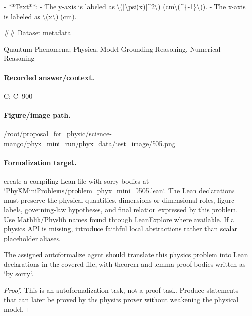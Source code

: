 - **Text**:
  - The y-axis is labeled as \textbackslash{}(|\textbackslash{}psi(x)|\textasciicircum{}2\textbackslash{}) (cm\textbackslash{}(\textasciicircum{}\{-1\}\textbackslash{})).
  - The x-axis is labeled as \textbackslash{}(x\textbackslash{}) (cm).

\#\# Dataset metadata

Quantum Phenomena; Physical Model Grounding Reasoning, Numerical Reasoning

\paragraph{Recorded answer/context.}
C: C: 900

\paragraph{Figure/image path.}
/root/proposal\_for\_physic/science-mango/phyx\_mini\_run/phyx\_data/test\_image/505.png

\paragraph{Formalization target.}
create a compiling Lean file with sorry bodies at `PhyXMiniProblems/problem\_phyx\_mini\_0505.lean`. The Lean declarations must preserve the physical quantities, dimensions or dimensional roles, figure labels, governing-law hypotheses, and final relation expressed by this problem.
Use Mathlib/Physlib names found through LeanExplore where available. If a physics API is missing, introduce faithful local abstractions rather than scalar placeholder aliases.

\begin{theorem}
\label{thm:physics:phyx_mini_0505:target}
The assigned autoformalize agent should translate this physics problem into Lean declarations in the covered file, with theorem and lemma proof bodies written as `by sorry`.
\end{theorem}
\begin{proof}
This is an autoformalization task, not a proof task. Produce statements that can later be proved by the physics prover without weakening the physical model.
\end{proof}

